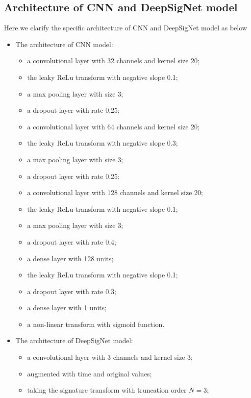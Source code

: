 \documentclass[]{article}
\renewcommand{\(}{\left(}
\renewcommand{\)}{\right)}
\begin{document}
	\subsection{Architecture of CNN and DeepSigNet model}
	\label{subapdix-architecture1}
	Here we clarify the specific architecture of CNN and DeepSigNet model as below
	\begin{itemize}
		\item The architecture of CNN model:
		\begin{itemize}
			\item[-] a convolutional layer with 32 channels and kernel size 20;
			\item[-] the leaky ReLu transform with negative slope 0.1;
			\item[-] a max pooling layer with size 3;
			\item[-] a dropout layer with rate 0.25;			
			\item[-] a convolutional layer with 64 channels and kernel size 20;
			\item[-] the leaky ReLu transform with negative slope 0.3;
			\item[-] a max pooling layer with size 3;
			\item[-] a dropout layer with rate 0.25;
			\item[-] a convolutional layer with 128 channels and kernel size 20;
			\item[-] the leaky ReLu transform with negative slope 0.1;
			\item[-] a max pooling layer with size 3;
			\item[-] a dropout layer with rate 0.4;
			\item[-] a dense layer with 128 units;
			\item[-] the leaky ReLu transform with negative slope 0.1;
			\item[-] a dropout layer with rate 0.3;
			\item[-] a dense layer with 1 units;
			\item[-] a non-linear transform with sigmoid function.			
		\end{itemize}
		\item The architecture of DeepSigNet model:
		\begin{itemize}
			\item[-] a convolutional layer with 3 channels and kernel size 3;
			\item[-] augmented with time and original values;
			\item[-] taking the signature transform with truncation order $N=3$;

\end{itemize}
\end{itemize}
\end{document}
